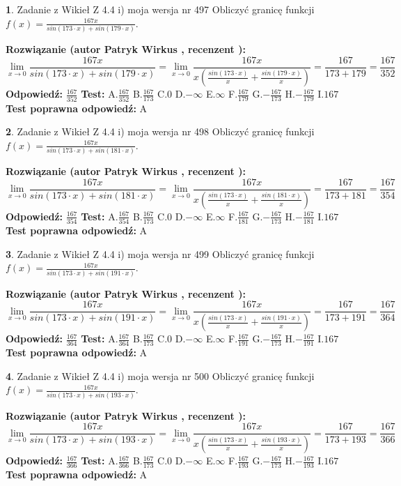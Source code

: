 \documentclass[12pt, a4paper]{article}
\theoremstyle{definition} %
\newtheorem{zad}{}
\newcommand{\zadStart}[1]{\begin{zad}#1\newline}
\newcommand{\zadStop}{\end{zad}}
\newcommand{\rozwStart}[2]{\noindent \textbf{Rozwiązanie (autor #1 , recenzent #2): }\newline}
\newcommand{\rozwStop}{\newline}
\newcommand{\odpStart}{\noindent \textbf{Odpowiedź:}\newline}
\newcommand{\odpStop}{\newline}
\newcommand{\testStart}{\noindent \textbf{Test:}\newline}
\newcommand{\testStop}{\newline}
\newcommand{\kluczStart}{\noindent \textbf{Test poprawna odpowiedź:}\newline}
\newcommand{\kluczStop}{\newline}
\begin{document}
\zadStart{Zadanie z Wikieł Z 4.4 i) moja wersja nr 497}
Obliczyć granicę funkcji $f(x)=\frac{167x}{sin(173\cdot x) +sin(179\cdot x)}$.
\zadStop
\rozwStart{Patryk Wirkus}{}
$$\lim\limits_{x\to 0}\frac{167x}{sin(173\cdot x) +sin(179\cdot x)}=\lim\limits_{x\to 0}\frac{167x}{x(\frac{sin(173\cdot x)}{x}+\frac{sin(179\cdot x)}{x})}=\frac{167}{173+179} = \frac{167}{352}$$
\rozwStop
\odpStart
$\frac{167}{352}$
\odpStop
\testStart
A.$\frac{167}{352}$
B.$\frac{167}{173}$
C.$0$
D.$-\infty$
E.$\infty$
F.$\frac{167}{179}$
G.$-\frac{167}{173}$
H.$-\frac{167}{179}$
I.$167$
\testStop
\kluczStart
A
\kluczStop



\zadStart{Zadanie z Wikieł Z 4.4 i) moja wersja nr 498}
Obliczyć granicę funkcji $f(x)=\frac{167x}{sin(173\cdot x) +sin(181\cdot x)}$.
\zadStop
\rozwStart{Patryk Wirkus}{}
$$\lim\limits_{x\to 0}\frac{167x}{sin(173\cdot x) +sin(181\cdot x)}=\lim\limits_{x\to 0}\frac{167x}{x(\frac{sin(173\cdot x)}{x}+\frac{sin(181\cdot x)}{x})}=\frac{167}{173+181} = \frac{167}{354}$$
\rozwStop
\odpStart
$\frac{167}{354}$
\odpStop
\testStart
A.$\frac{167}{354}$
B.$\frac{167}{173}$
C.$0$
D.$-\infty$
E.$\infty$
F.$\frac{167}{181}$
G.$-\frac{167}{173}$
H.$-\frac{167}{181}$
I.$167$
\testStop
\kluczStart
A
\kluczStop



\zadStart{Zadanie z Wikieł Z 4.4 i) moja wersja nr 499}
Obliczyć granicę funkcji $f(x)=\frac{167x}{sin(173\cdot x) +sin(191\cdot x)}$.
\zadStop
\rozwStart{Patryk Wirkus}{}
$$\lim\limits_{x\to 0}\frac{167x}{sin(173\cdot x) +sin(191\cdot x)}=\lim\limits_{x\to 0}\frac{167x}{x(\frac{sin(173\cdot x)}{x}+\frac{sin(191\cdot x)}{x})}=\frac{167}{173+191} = \frac{167}{364}$$
\rozwStop
\odpStart
$\frac{167}{364}$
\odpStop
\testStart
A.$\frac{167}{364}$
B.$\frac{167}{173}$
C.$0$
D.$-\infty$
E.$\infty$
F.$\frac{167}{191}$
G.$-\frac{167}{173}$
H.$-\frac{167}{191}$
I.$167$
\testStop
\kluczStart
A
\kluczStop



\zadStart{Zadanie z Wikieł Z 4.4 i) moja wersja nr 500}
Obliczyć granicę funkcji $f(x)=\frac{167x}{sin(173\cdot x) +sin(193\cdot x)}$.
\zadStop
\rozwStart{Patryk Wirkus}{}
$$\lim\limits_{x\to 0}\frac{167x}{sin(173\cdot x) +sin(193\cdot x)}=\lim\limits_{x\to 0}\frac{167x}{x(\frac{sin(173\cdot x)}{x}+\frac{sin(193\cdot x)}{x})}=\frac{167}{173+193} = \frac{167}{366}$$
\rozwStop
\odpStart
$\frac{167}{366}$
\odpStop
\testStart
A.$\frac{167}{366}$
B.$\frac{167}{173}$
C.$0$
D.$-\infty$
E.$\infty$
F.$\frac{167}{193}$
G.$-\frac{167}{173}$
H.$-\frac{167}{193}$
I.$167$
\testStop
\kluczStart
A
\kluczStop
\end{document}
